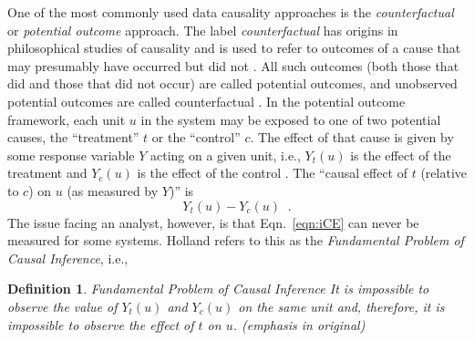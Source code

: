 \documentclass{article}[10pt]
\newtheorem{mydef}{Definition}[section]
\begin{document}
One of the most commonly used data causality approaches is the {\em counterfactual} or {\em potential outcome} approach.  The label {\em counterfactual} has origins in philosophical studies of causality and is used to refer to outcomes of a cause that may presumably have occurred but did not \cite{Illari2014,Imbens2015}.  All such outcomes (both those that did and those that did not occur) are called potential outcomes, and unobserved potential outcomes are called counterfactual \cite{Morgan2014}.  In the potential outcome framework, each unit $u$ in the system may be exposed to one of two potential causes, the ``treatment'' $t$ or the ``control'' $c$.  The effect of that cause is given by some response variable $Y$ acting on a given unit, i.e., $Y_t(u)$ is the effect of the treatment and $Y_c(u)$ is the effect of the control \cite{Holland1986,Morgan2014,Imbens2015}.  The ``causal effect of $t$ (relative to $c$) on $u$ (as measured by $Y$)'' \cite{Holland1986} is
\begin{equation}
\label{eqn:iCE}
Y_t(u)-Y_c(u)\;\;.
\end{equation}
The issue facing an analyst, however, is that Eqn.\ \ref{eqn:iCE} can never be measured for some systems.  Holland refers to this as the {\em Fundamental Problem of Causal Inference}, i.e.,
\begin{mydef}
{\em Fundamental Problem of Causal Inference} It is impossible to {\em observe} the value of $Y_t(u)$ and $Y_c(u)$ on the same unit and, therefore, it is impossible to {\em observe} the effect of $t$ on $u$. \cite{Holland1986} (emphasis in original)
\end{mydef}
\end{document}
